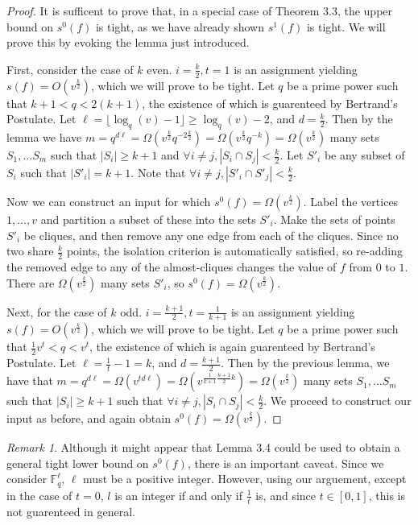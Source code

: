 \documentclass[psamsfonts]{amsart}
\theoremstyle{definition}
\theoremstyle{remark}
\newtheorem{rem}[theorem]{Remark}
\numberwithin{equation}{section}
\begin{document}
	\begin{proof}
		It is sufficent to prove that, in a special case of Theorem 3.3, the upper bound on $s^0(f)$ is tight, as we have already shown $s^{1}(f)$ is tight. We will prove this by evoking the lemma just introduced.

		First, consider the case of $k$ even. $i=\frac{k}{2},t=1$ is an assignment yielding $s(f)=O(v^\frac{k}{2})$, which we will prove to be tight.  Let $q$ be a prime power such that $k+1<q<2(k+1)$, the existence of which is guarenteed by Bertrand's Postulate. Let $\ell=\lfloor\log_q(v)-1\rfloor\geq\log_q(v)-2$, and $d=\frac{k}{2}$. Then by the lemma we have $m=q^{d\ell}=\Omega(v^\frac{k}{2}q^{-2\frac{k}{2}})=\Omega(v^\frac{k}{2}q^{-k})=\Omega(v^\frac{k}{2})$ many sets $S_1,\ldots S_m$ such that $|S_i|\geq k+1$ and $\forall i\neq j , |S_i\cap S_j|<\frac{k}{2}$. Let $S'_i$ be any subset of $S_i$ such that $|S'_i|=k+1$. Note that $\forall i\neq j,|S'_i\cap S'_j|<\frac{k}{2}$.

		Now we can construct an input for which $s^0(f)=\Omega(v^\frac{k}{2})$. Label the vertices $1,\ldots ,v$ and partition a subset of these into the sets $S'_i$. Make the sets of points $S'_i$ be cliques, and then remove any one edge from each of the cliques. Since no two share $\frac{k}{2}$ points, the isolation criterion is automatically satisfied, so re-adding the removed edge to any of the almost-cliques changes the value of $f$ from $0$ to $1$. There are $\Omega(v^\frac{k}{2})$ many sets $S'_i$, so $s^0(f)=\Omega(v^\frac{k}{2})$.

		Next, for the case of $k$ odd.  $i=\frac{k+1}{2},t=\frac{1}{k+1}$ is an assignment yielding\\
$s(f)=O(v^\frac{k}{2})$, which we will prove to be tight. Let $q$ be a prime power such that $\frac{1}{2}v^t<q<v^t$, the existence of which is again guarenteed by Bertrand's Postulate.  Let $\ell=\frac{1}{t}-1=k$, and $d=\frac{k+1}{2}$. Then by the previous lemma, we have that $m=q^{d\ell}=\Omega(v^{td\ell})=\Omega(v^{\frac{1}{k+1}\frac{k+1}{2}k})=\Omega(v^\frac{k}{2})$ many sets $S_1,\ldots S_m$ such that $|S_i|\geq k+1$ such that $\forall i\neq j,|S_i\cap S_j|<\frac{k}{2}$. We proceed to construct our input as before, and again obtain $s^0(f)=\Omega(v^\frac{k}{2})$.
	\end{proof}

	\begin{rem}
		Although it might appear that Lemma 3.4 could be used to obtain a general tight lower bound on $s^0(f)$, there is an important caveat. Since we consider $\mathbb{F}^\ell_q$, $\ell$ must be a positive integer. However, using our arguement, except in the case of $t=0$, $l$ is an integer if and only if $\frac{1}{t}$ is, and since $t\in[0,1]$, this is not guarenteed in general.
	\end{rem}
\end{document}
